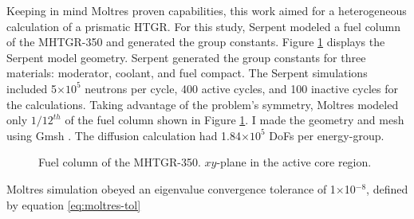 Keeping in mind Moltres proven capabilities, this work aimed for a heterogeneous calculation of a prismatic \gls{HTGR}.
For this study, Serpent modeled a fuel column of the MHTGR-350 and generated the group constants.
Figure \ref{fig:fuelcolumn} displays the Serpent model geometry.
Serpent generated the group constants for three materials: moderator, coolant, and fuel compact.
The Serpent simulations included 5$\times 10^5$ neutrons per cycle, 400 active cycles, and 100 inactive cycles for the calculations.
Taking advantage of the problem's symmetry, Moltres modeled only $1/12^{th}$ of the fuel column shown in Figure \ref{fig:fuelcolumn}.
I made the geometry and mesh using Gmsh \cite{geuzaine_gmsh_2020}.
The diffusion calculation had 1.84$\times 10^5$ \glspl{DoF} per energy-group.

\begin{figure}[htbp!]
	\centering
	\hfill
    \caption{Fuel column of the MHTGR-350. $xy$-plane in the active core region.}
	\label{fig:fuelcolumn}
\end{figure}

Moltres simulation obeyed an eigenvalue convergence tolerance of 1$\times$10$^{-8}$, defined by equation \ref{eq:moltres-tol}


